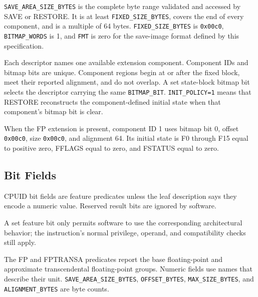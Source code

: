 

\texttt{SAVE\_AREA\_SIZE\_BYTES} is the complete byte range validated and accessed by SAVE or RESTORE. It is at
least \texttt{FIXED\_SIZE\_BYTES}, covers the end of every component, and is a multiple of 64 bytes.
\texttt{FIXED\_SIZE\_BYTES} is \texttt{0x00c0}, \texttt{BITMAP\_WORDS} is 1, and \texttt{FMT} is zero for the
save-image format defined by this specification.

Each descriptor names one available extension component. Component IDs and bitmap bits are unique. Component
regions begin at or after the fixed block, meet their reported alignment, and do not overlap. A set state-block
bitmap bit selects the descriptor carrying the same \texttt{BITMAP\_BIT}. \texttt{INIT\_POLICY=1} means that
RESTORE reconstructs the component-defined initial state when that component's bitmap bit is clear.

When the FP extension is present, component ID 1 uses bitmap bit 0, offset \texttt{0x00c0}, size
\texttt{0x00c0}, and alignment 64. Its initial state is F0 through F15 equal to positive zero, FFLAGS equal to zero,
and FSTATUS equal to zero.

\subsection{Bit Fields}
CPUID bit fields are feature predicates unless the leaf description says they encode a numeric value. Reserved
result bits are ignored by software.

A set feature bit only permits software to use the corresponding architectural behavior; the instruction's normal
privilege, operand, and compatibility checks still apply.

The FP and FPTRANSA predicates report the base floating-point and approximate transcendental floating-point groups.
Numeric fields use names that describe their unit. \texttt{SAVE\_AREA\_SIZE\_BYTES},
\texttt{OFFSET\_BYTES}, \texttt{MAX\_SIZE\_BYTES}, and \texttt{ALIGNMENT\_BYTES} are byte counts.
